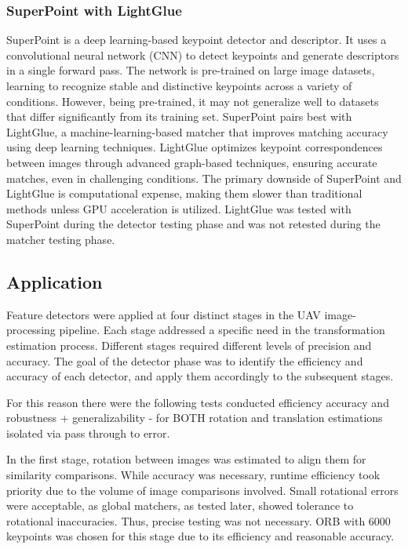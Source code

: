 \subsubsection*{SuperPoint with LightGlue}
SuperPoint is a deep learning-based keypoint detector and descriptor. It uses a convolutional neural network (CNN) to detect keypoints and generate descriptors in a single forward pass. The network is pre-trained on large image datasets, learning to recognize stable and distinctive keypoints across a variety of conditions. However, being pre-trained, it may not generalize well to datasets that differ significantly from its training set. SuperPoint pairs best with LightGlue, a machine-learning-based matcher that improves matching accuracy using deep learning techniques. LightGlue optimizes keypoint correspondences between images through advanced graph-based techniques, ensuring accurate matches, even in challenging conditions. The primary downside of SuperPoint and LightGlue is computational expense, making them slower than traditional methods unless GPU acceleration is utilized. LightGlue was tested with SuperPoint during the detector testing phase and was not retested during the matcher testing phase.



\subsection*{Application}

Feature detectors were applied at four distinct stages in the UAV image-processing pipeline. Each stage addressed a specific need in the transformation estimation process. Different stages required different levels of precision and accuracy. The goal of the detector phase was to identify the efficiency and accuracy of each detector, and apply them accordingly to the subsequent stages.

For this reason there were the following tests conducted
efficiency
accuracy and robustness + generalizability - for BOTH rotation and translation estimations isolated via pass through to error. 




In the first stage, rotation between images was estimated to align them for similarity comparisons. While accuracy was necessary, runtime efficiency took priority due to the volume of image comparisons involved. Small rotational errors were acceptable, as global matchers, as tested later, showed tolerance to rotational inaccuracies. Thus, precise testing was not necessary. ORB with 6000 keypoints was chosen for this stage due to its efficiency and reasonable accuracy.

